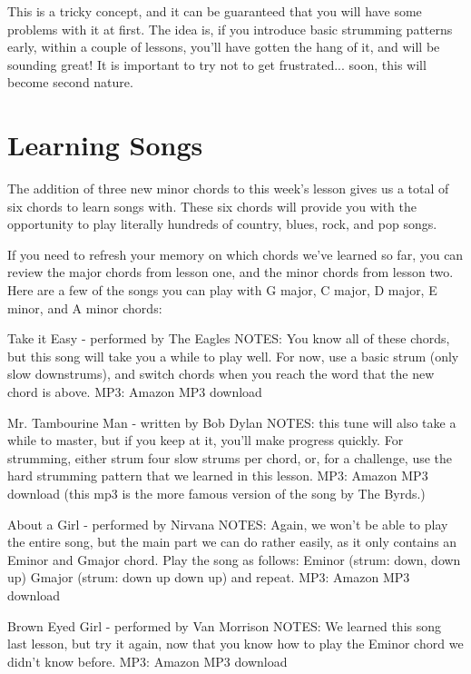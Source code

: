 This is a tricky concept, and it can be guaranteed that you will have some problems with it at first. The idea is, if you introduce basic strumming patterns early, within a couple of lessons, you'll have gotten the hang of it, and will be sounding great! It is important to try not to get frustrated... soon, this will become second nature.

\section{Learning Songs}
The addition of three new minor chords to this week's lesson gives us a total of six chords to learn songs with. These six chords will provide you with the opportunity to play literally hundreds of country, blues, rock, and pop songs.

If you need to refresh your memory on which chords we've learned so far, you can review the major chords from lesson one, and the minor chords from lesson two. Here are a few of the songs you can play with G major, C major, D major, E minor, and A minor chords:

Take it Easy - performed by The Eagles
NOTES: You know all of these chords, but this song will take you a while to play well. For now, use a basic strum (only slow downstrums), and switch chords when you reach the word that the new chord is above.
MP3: Amazon MP3 download

Mr. Tambourine Man - written by Bob Dylan
NOTES: this tune will also take a while to master, but if you keep at it, you'll make progress quickly. For strumming, either strum four slow strums per chord, or, for a challenge, use the hard strumming pattern that we learned in this lesson.
MP3: Amazon MP3 download
(this mp3 is the more famous version of the song by The Byrds.)

About a Girl - performed by Nirvana
NOTES: Again, we won't be able to play the entire song, but the main part we can do rather easily, as it only contains an Eminor and Gmajor chord. Play the song as follows: Eminor (strum: down, down up) Gmajor (strum: down up down up) and repeat.
MP3: Amazon MP3 download

Brown Eyed Girl - performed by Van Morrison
NOTES: We learned this song last lesson, but try it again, now that you know how to play the Eminor chord we didn't know before.
MP3: Amazon MP3 download


